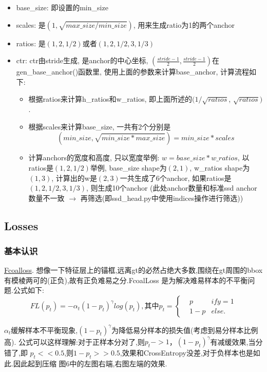 \documentclass[UTF8]{ctexart}
\begin{document}
\begin{itemize}
	\item base\_size: 即设置的min\_size
	\item scales: 是$(1, \sqrt{max\_size / min\_size})$, 用来生成ratio为1的两个anchor
	\item ratios: 是$(1, 2, 1/2)$或者$(1, 2, 1/2, 3, 1/3)$
	\item ctr: ctr由stride生成, 是anchor的中心坐标, $(\frac{stride - 1}{2}, \frac{stride - 1}{2} ) $在gen\_base\_anchor()函数里, 使用上面的参数来计算base\_anchor, 计算流程如下:
	\begin{itemize}
		\item 根据ratios来计算h\_ratios和w\_ratios, 即上面所述的$(1 / \sqrt{ratios}$, $\sqrt{ratios}) $.
		\item 根据scales来计算base\_size, 一共有2个分别是$$(min\_size, \sqrt{min\_size * max\_size}) = min\_size * scales$$
		\item 计算anchors的宽度和高度, 只以宽度举例: $w = base\_size * w\_ratios$, 以ratios是$(1, 2, 1/2)$举例, base\_size shape为$(2, 1)$, w\_ratios shape为$(1, 3)$, 
		计算出的w是$(2, 3) $一共生成了6个anchor, 如果ratios是$(1, 2, 1/2, 3, 1/3)$, 则生成10个anchor (此处anchor数量和标准ssd anchor数量不一致 $\rightarrow$
		 再筛选(即ssd\_head.py中使用indices操作进行筛选))
	\end{itemize}
	
\end{itemize}



\subsection{Losses}
\label{sec:loss}
\subsubsection{基本认识}

\href{https://arxiv.org/abs/1708.02002}{Fcoalloss}.
想像一下特征层上的锚框,远离gt的必然占绝大多数,围绕在gt周围的bbox有模棱两可的(正负),故有正负难易之分.FcoalLoss 是为解决难易样本的不平衡问题.公式如下:
\begin{equation}
	FL(p_t) = -\alpha_{t}(1-p_t)^{\gamma}log(p_t),\text{其中}
	p_t=\left\{
	\begin{aligned}
	&p & if y =1\\
	&1-p & else.
	\end{aligned}
	\right.
\end{equation}

$\alpha_t$缓解样本不平衡现象,$(1-p_t)^{\gamma}$为降低易分样本的损失值(考虑到易分样本比例高).
公式可以这样理解:对于正样本分对了,则$p_t->1$，$(1-p_t)^{\gamma}$有减缓效果,当分错了,即
$p_t << 0.5$,则$1-p_t >>0.5$,效果和CrossEntropy没差,对于负样本也是如此.因此起到压缩
图6中的左图右端,右图左端的效果.
\end{document}
